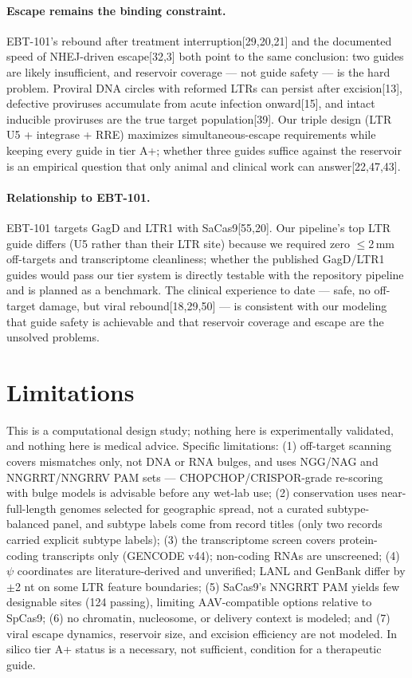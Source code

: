 \documentclass[11pt]{article}
\newcommand{\src}[1]{[#1]}
\begin{document}
\paragraph{Escape remains the binding constraint.} EBT-101's rebound after
treatment interruption\src{29,20,21} and the documented speed of NHEJ-driven
escape\src{32,3} both point to the same conclusion: two guides are likely
insufficient, and reservoir coverage --- not guide safety --- is the hard
problem. Proviral DNA circles with reformed LTRs can persist after
excision\src{13}, defective proviruses accumulate from acute infection
onward\src{15}, and intact inducible proviruses are the true target
population\src{39}. Our triple design (LTR U5 + integrase + RRE) maximizes
simultaneous-escape requirements while keeping every guide in tier A+;
whether three guides suffice against the reservoir is an empirical question
that only animal and clinical work can answer\src{22,47,43}.

\paragraph{Relationship to EBT-101.} EBT-101 targets GagD and LTR1 with
SaCas9\src{55,20}. Our pipeline's top LTR guide differs (U5 rather than
their LTR site) because we required zero $\le$2\,mm off-targets and
transcriptome cleanliness; whether the published GagD/LTR1 guides would
pass our tier system is directly testable with the repository pipeline and
is planned as a benchmark. The clinical experience to date --- safe, no
off-target damage, but viral rebound\src{18,29,50} --- is consistent with
our modeling that guide safety is achievable and that reservoir coverage
and escape are the unsolved problems.

\section{Limitations}
This is a computational design study; nothing here is experimentally
validated, and nothing here is medical advice. Specific limitations:
(1) off-target scanning covers mismatches only, not DNA or RNA bulges, and
uses NGG/NAG and NNGRRT/NNGRRV PAM sets --- CHOPCHOP/CRISPOR-grade
re-scoring with bulge models is advisable before any wet-lab use;
(2) conservation uses \nstrains{} near-full-length genomes selected for
geographic spread, not a curated subtype-balanced panel, and subtype labels
come from record titles (only two records carried explicit subtype labels);
(3) the transcriptome screen covers protein-coding transcripts only
(GENCODE v44); non-coding RNAs are unscreened;
(4) $\psi$ coordinates are literature-derived and unverified; LANL and
GenBank differ by $\pm$2 nt on some LTR feature boundaries;
(5) SaCas9's NNGRRT PAM yields few designable sites (124 passing), limiting
AAV-compatible options relative to SpCas9;
(6) no chromatin, nucleosome, or delivery context is modeled; and
(7) viral escape dynamics, reservoir size, and excision efficiency are not
modeled. In silico tier A+ status is a necessary, not sufficient, condition
for a therapeutic guide.
\end{document}
